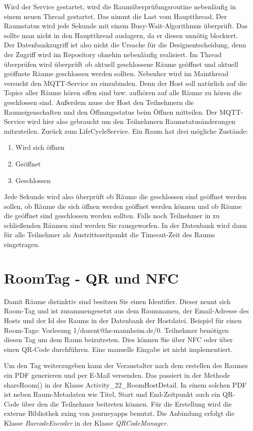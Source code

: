 Wird der Service gestartet, wird die Raumüberprüfungsroutine nebenläufig in einem neuen Thread gestartet. Das nimmt die Last vom Hauptthread. Der Raumstatus wird jede Sekunde mit einem Busy-Wait-Algorithmus überprüft. Das sollte man nicht in den Hauptthread auslagern, da er diesen unnötig blockiert. 
Der Datenbankzugriff ist also nicht die Ursache für die Designentscheidung, denn der Zugriff wird im Repository ohnehin nebenläufig realisiert.
Im Thread überprüfen wird überprüft ob aktuell geschlossene Räume geöffnet und aktuell geöffnete Räume geschlossen werden sollten.
Nebenher wird im Mainthread versucht den MQTT-Service zu einzubinden. Denn der Host soll natürlich auf die Topics aller Räume hören offen sind bzw. aufhören auf alle Räume zu hören die geschlossen sind.
Außerdem muss der Host den Teilnehmern die Raumeigenschaften und den Öffnungsstatus beim Öffnen mitteilen. Der MQTT-Service wird hier also gebraucht um den Teilnehmern Raumstatusänderungen mitzuteilen.
Zurück zum LifeCycleService.
Ein Raum hat drei mögliche Zustände:
\begin{enumerate}
\item Wird sich öffnen
\item Geöffnet
\item Geschlossen
\end{enumerate}
 Jede Sekunde wird also überprüft ob Räume die geschlossen sind geöffnet werden sollen, ob Räume die sich öffnen werden geöffnet werden können und ob Räume die geöffnet sind geschlossen werden sollten. 
Falls noch Teilnehmer in zu schließenden Räumen sind werden Sie rausgeworfen. In der Datenbank wird dann für alle Teilnehmer als Austrittszeitpunkt die Timeout-Zeit des Raums eingetragen. 

\section{RoomTag - QR und NFC}
\label{sec:RoomTag - QR und NFC}
Damit Räume distinktiv sind besitzen Sie einen Identifier. Dieser nennt sich Room-Tag und ist zusammengesetzt aus dem Raumnamen, der Email-Adresse des Hosts und der Id des Raums in der Datenbank der Hostdatei. Beispiel für einen Room-Tags: Vorlesung 1/dozent@hs-mannheim.de/0.
Teilnehmer benötigen diesen Tag um dem Raum beizutreten. Dies können Sie über NFC oder über einen QR-Code durchführen. Eine manuelle Eingabe ist nicht implementiert.

Um den Tag weiterzugeben kann der Veranstalter nach dem erstellen des Raumes ein PDF generieren und per E-Mail versenden. 
Das passiert in der Methode shareRoom() in der Klasse Activity\_22\_RoomHostDetail. 
In einem solchen PDF ist neben Raum-Metadaten wie Titel, Start und End-Zeitpunkt auch ein QR-Code über den die Teilnehmer beitreten können. 
Für die Erstellung wird die externe Bibliothek zxing von journeyapps benutzt. Die Anbindung erfolgt die Klasse \textit{BarcodeEncoder} in der Klasse \textit{QRCodeManager}.

